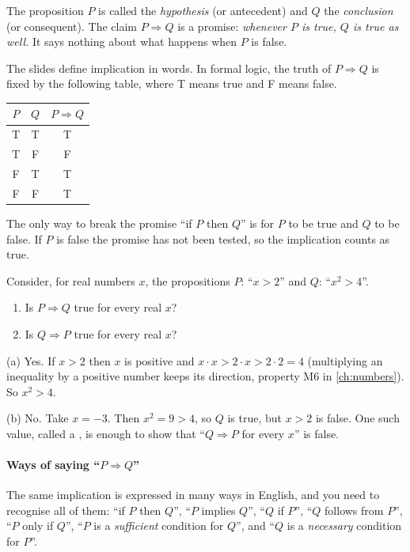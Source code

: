 The proposition $P$ is called the \emph{hypothesis} (or antecedent) and $Q$ the \emph{conclusion} (or
consequent). The claim $P\Rightarrow Q$ is a promise: \emph{whenever $P$ is true, $Q$ is true as well.}
It says nothing about what happens when $P$ is false.

\begin{external}
The slides define implication in words. In formal logic, the truth of $P\Rightarrow Q$ is fixed by the
following table, where T means true and F means false.
\begin{center}
\begin{tabular}{cc|c}
\toprule
$P$ & $Q$ & $P\Rightarrow Q$\\
\midrule
T & T & T\\
T & F & F\\
F & T & T\\
F & F & T\\
\bottomrule
\end{tabular}
\end{center}
The only way to break the promise ``if $P$ then $Q$'' is for $P$ to be true and $Q$ to be false. If $P$
is false the promise has not been tested, so the implication counts as true.
\end{external}

\begin{example}
Consider, for real numbers $x$, the propositions $P$: ``$x>2$'' and $Q$: ``$x^2>4$''.
\begin{enumerate}
  \item Is $P\Rightarrow Q$ true for every real $x$?
  \item Is $Q\Rightarrow P$ true for every real $x$?
\end{enumerate}
\solution
(a) Yes. If $x>2$ then $x$ is positive and $x\cdot x>2\cdot x>2\cdot 2=4$ (multiplying an inequality
by a positive number keeps its direction, property M6 in \cref{ch:numbers}). So $x^2>4$.

(b) No. Take $x=-3$. Then $x^2=9>4$, so $Q$ is true, but $x>2$ is false. One such value, called a
, is enough to show that ``$Q\Rightarrow P$ for every $x$'' is false.
\end{example}

\paragraph{Ways of saying ``$P\Rightarrow Q$''} The same implication is expressed in many ways in
English, and you need to recognise all of them:
``if $P$ then $Q$'', ``$P$ implies $Q$'', ``$Q$ if $P$'', ``$Q$ follows from $P$'',
``$P$ only if $Q$'', ``$P$ is a \emph{sufficient} condition for $Q$'', and
``$Q$ is a \emph{necessary} condition for $P$''.


